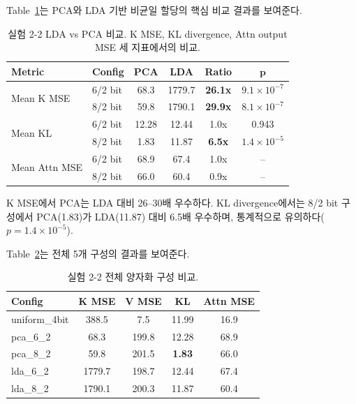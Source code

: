\documentclass[11pt,a4paper]{article}
\begin{document}
Table~\ref{tab:lda_pca}는 PCA와 LDA 기반 비균일 할당의 핵심 비교 결과를 보여준다.

\begin{table}[H]
\centering
\caption{실험 2-2 LDA vs PCA 비교. K MSE, KL divergence, Attn output MSE 세 지표에서의 비교.}
\label{tab:lda_pca}
\begin{tabular}{llcccc}
\toprule
\textbf{Metric} & \textbf{Config} & \textbf{PCA} & \textbf{LDA} & \textbf{Ratio} & $\boldsymbol{p}$ \\
\midrule
\multirow{2}{*}{Mean K MSE} & 6/2 bit & 68.3 & 1779.7 & \textbf{26.1x} & $9.1 \times 10^{-7}$ \\
 & 8/2 bit & 59.8 & 1790.1 & \textbf{29.9x} & $8.1 \times 10^{-7}$ \\
\midrule
\multirow{2}{*}{Mean KL} & 6/2 bit & 12.28 & 12.44 & 1.0x & 0.943 \\
 & 8/2 bit & 1.83 & 11.87 & \textbf{6.5x} & $1.4 \times 10^{-5}$ \\
\midrule
\multirow{2}{*}{Mean Attn MSE} & 6/2 bit & 68.9 & 67.4 & 1.0x & -- \\
 & 8/2 bit & 66.0 & 60.4 & 0.9x & -- \\
\bottomrule
\end{tabular}
\end{table}

K MSE에서 PCA는 LDA 대비 26--30배 우수하다.
KL divergence에서는 8/2 bit 구성에서 PCA(1.83)가 LDA(11.87) 대비 6.5배 우수하며, 통계적으로 유의하다($p = 1.4 \times 10^{-5}$).

Table~\ref{tab:all_configs}는 전체 5개 구성의 결과를 보여준다.

\begin{table}[H]
\centering
\caption{실험 2-2 전체 양자화 구성 비교.}
\label{tab:all_configs}
\begin{tabular}{lcccc}
\toprule
\textbf{Config} & \textbf{K MSE} & \textbf{V MSE} & \textbf{KL} & \textbf{Attn MSE} \\
\midrule
uniform\_4bit & 388.5 & 7.5 & 11.99 & 16.9 \\
pca\_6\_2 & 68.3 & 199.8 & 12.28 & 68.9 \\
pca\_8\_2 & 59.8 & 201.5 & \textbf{1.83} & 66.0 \\
lda\_6\_2 & 1779.7 & 198.7 & 12.44 & 67.4 \\
lda\_8\_2 & 1790.1 & 200.3 & 11.87 & 60.4 \\
\bottomrule
\end{tabular}
\end{table}
\end{document}

